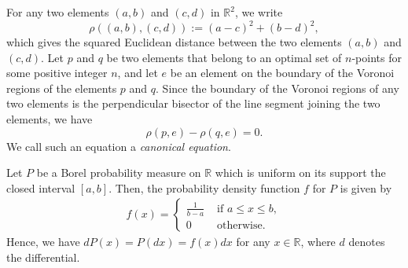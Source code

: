 \documentclass[12pt, reqno]{amsart}
\theoremstyle{plain}
\theoremstyle{definition}
\newcommand{\set}[1]{\{#1\}}%
\newcommand{\ga}{\alpha}
\newcommand{\tit}{\textit}%
\newcommand{\D}[1]{\mathbb{#1}}%
\newcommand{\te}{\text}%
\begin{document}
For any two elements $(a, b)$ and $(c, d)$ in $\D R^2$, we write 
 \[\rho((a, b), (c, d)):=(a-c)^2 +(b-d)^2,\] which gives the squared Euclidean distance between the two elements $(a, b)$ and $(c, d)$. Let $p$ and $q$ be two elements that belong to an optimal set of $n$-points for some positive integer $n$, and let $e$ be an element on the boundary of the Voronoi regions of the elements $p$ and $q$. Since the boundary of the Voronoi regions of any two elements is the perpendicular bisector of the line segment joining the two elements, we have
\[\rho(p, e)-\rho(q, e)=0. \]
We call such an equation a \tit{canonical equation}. 

Let $P$ be a Borel probability measure on $\D R$ which is uniform on its support the closed interval $[a, b]$. Then, the probability density function $f$ for $P$ is given by 
\begin{align} \label{eq000} 
f(x)=\left\{\begin{array}{cc}
 \frac 1 {b-a} & \te{ if } a\leq x\leq b,\\
 0 & \te{ otherwise}.
\end{array}\right.
\end{align} 
Hence, we have $dP(x)=P(dx)=f(x) dx$ for any $x\in \D R$, where $d$ denotes the differential.  
   
\end{document}
